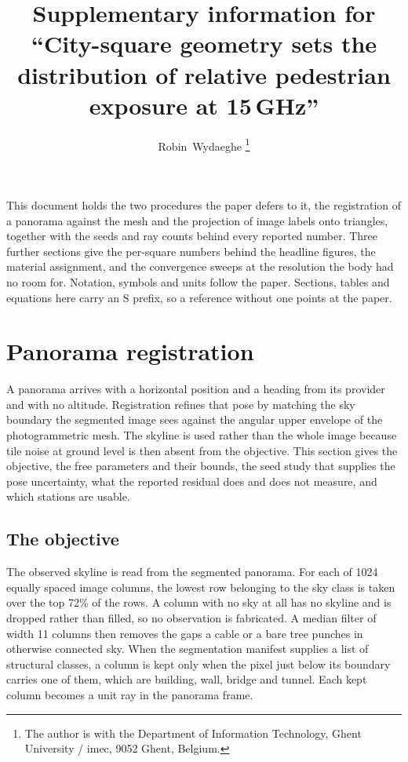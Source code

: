 \documentclass[journal]{IEEEtran}
\begin{document}
\title{Supplementary information for ``City-square geometry sets the
distribution of relative pedestrian exposure at 15\,GHz''}
\author{Robin~Wydaeghe%
\thanks{The author is with the Department of Information Technology, Ghent
University / imec, 9052 Ghent, Belgium.}}

\maketitle

This document holds the two procedures the paper defers to it, the registration
of a panorama against the mesh and the projection of image labels onto
triangles, together with the seeds and ray counts behind every reported number.
Three further sections give the per-square numbers behind the headline figures,
the material assignment, and the convergence sweeps at the resolution the body
had no room for. Notation, symbols and units follow the paper. Sections, tables
and equations here carry an S prefix, so a reference without one points at the
paper.

\section{Panorama registration}
\label{sec:si-registration}

A panorama arrives with a horizontal position and a heading from its provider
and with no altitude. Registration refines that pose by matching the sky
boundary the segmented image sees against the angular upper envelope of the
photogrammetric mesh. The skyline is used rather than the whole image because
tile noise at ground level is then absent from the objective. This section gives
the objective, the free parameters and their bounds, the seed study that
supplies the pose uncertainty, what the reported residual does and does not
measure, and which stations are usable.

\subsection{The objective}

The observed skyline is read from the segmented panorama. For each of 1024
equally spaced image columns, the lowest row belonging to the sky class is taken
over the top 72\% of the rows. A column with no sky at all has no skyline and is
dropped rather than filled, so no observation is fabricated. A median filter of
width 11 columns then removes the gaps a cable or a bare tree punches in
otherwise connected sky. When the segmentation manifest supplies a list of
structural classes, a column is kept only when the pixel just below its boundary
carries one of them, which are building, wall, bridge and tunnel. Each kept
column becomes a unit ray in the panorama frame.
\end{document}

